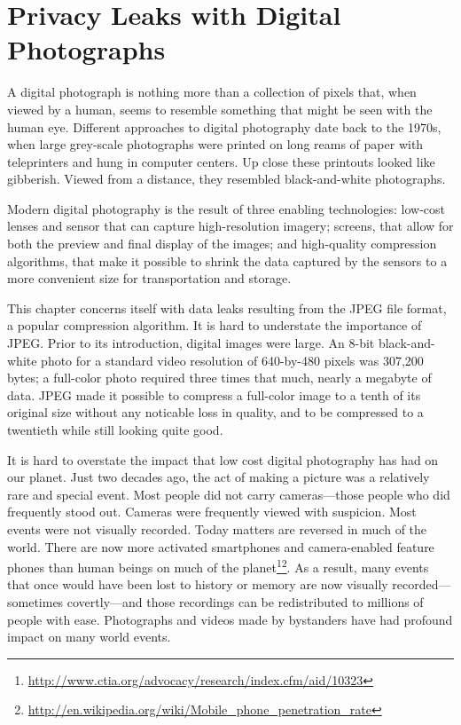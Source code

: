 \chapter{Privacy Leaks with Digital Photographs}\label{ch-jpeg}

A digital photograph is nothing more than a collection of
pixels that, when viewed by a human, seems to resemble something that
might be seen with the human eye. Different approaches to digital
photography date back to the 1970s, when large grey-scale photographs
were printed on long reams of paper with teleprinters and hung in
computer centers. Up close these printouts looked like
gibberish. Viewed from a distance, they resembled black-and-white photographs.

Modern digital photography is the result of three enabling
technologies: low-cost lenses and sensor that can capture
high-resolution imagery; screens, that allow for both the preview and
final display of the images; and high-quality compression algorithms,
that make it possible to shrink the data captured by the sensors to a
more convenient size for transportation and storage.

This chapter concerns itself with data leaks resulting from the JPEG
file format, a popular compression algorithm. It is hard to understate
the importance of JPEG. Prior to its introduction, digital images were
large. An 8-bit black-and-white photo for a standard video resolution
of 640-by-480 pixels was 307,200 bytes; a full-color photo required
three times that much, nearly a megabyte of data. JPEG made it
possible to compress a full-color image to a tenth of its original
size without any noticable loss in quality, and to be compressed to a
twentieth while still looking quite good.

It is hard to overstate the impact that low cost digital photography
has had on our planet. Just two decades ago, the act of making a
picture was a relatively rare and special event. Most people did not
carry cameras---those people who did frequently stood out. Cameras
were frequently viewed with suspicion. Most events were not visually
recorded. Today matters are reversed in much of the world. There are
now more activated smartphones and camera-enabled feature phones than
human beings on much of the
planet\footnote{\url{http://www.ctia.org/advocacy/research/index.cfm/aid/10323}}\footnote{\url{http://en.wikipedia.org/wiki/Mobile_phone_penetration_rate}}. As
a result, many events that once would have been lost to history or
memory are now visually recorded---sometimes covertly---and those
recordings can be redistributed to millions of people with
ease. Photographs and videos made by bystanders have had profound
impact on many world events.

